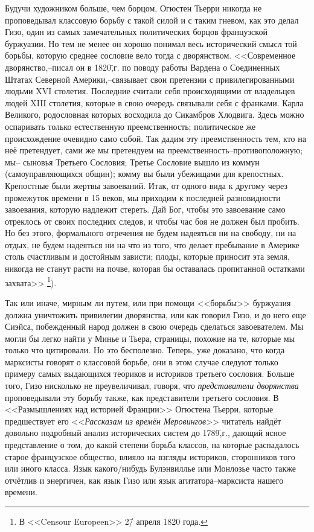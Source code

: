 Будучи художником больше, чем борцом, Огюстен Тьерри никогда не проповедывал классовую борьбу с такой силой и с таким гневом, как это делал Гизо, один из самых замечательных политических борцов французской буржуазии. Но тем не менее он хорошо понимал весь исторический смысл той борьбы, которую среднее сословие вело тогда с дворянством. <<Современное дворянство,\---писал он в 1820\=,г. по поводу работы Вардена о Соединенных Штатах Северной Америки,\---связывает свои претензии с привилегированными людьми XVI столетия. Последние считали себя происходящими от владельцев людей XIII столетия, которые в свою очередь связывали себя с франками. Карла Великого, родословная которых восходила до Сикамбров Хлодвига. Здесь можно оспаривать только естественную преемственность; политическое же происхождение очевидно само собой. Так дадим эту преемственность тем, кто на неё претендует, сами же мы претендуем на преемственность\---противоположную; мы\--- сыновья Третьего Сословия; Третье Сословие вышло из коммун (самоуправляющихся общин); комму вы были убежищами для крепостных. Крепостные были жертвы завоеваний. Итак, от одного вида к другому через промежуток времени в 15 веков, мы приходим к последней разновидности завоевания, которую надлежит стереть. Дай Бог, чтобы это завоевание само отреклось от своих последних следов, и чтобы час боя не должен был пробить. Но без этого, формального отречения не будем надеяться ни на свободу, ни на отдых, не будем надеяться ни на что из того, что делает пребывание в Америке столь счастливым и достойным зависти; плоды, которые приносит эта земля, никогда не станут расти на почве, которая бы оставалась пропитанной остатками захвата>> \footnote{В <<Censour Europeen>> 2\=/ апреля 1820 года.}).

Так или иначе, мирным ли путем, или при помощи <<борьбы>> буржуазия должна уничтожить привилегии дворянства, или как говорил Гизо, и до него еще Сиэйса, побежденный народ должен в свою очередь сделаться завоевателем. Мы могли бы легко найти у Минье и Тьера, страницы, похожие на те, которые мы только что цитировали. Но это бесполезно. Теперь, уже доказано, что когда марксисты говорят о классовой борьбе, они в этом случае следуют только примеру самых выдающихся теориков и историков третьего сословия. Больше того, Гизо нисколько не преувеличивал, говоря, что \emph{представители дворянства} проповедывали эту борьбу также, как представители третьего сословия. В <<Размышлениях над историей Франции>> Огюстена Тьерри, которые предшествует его <<\emph{Рассказам из времён Меровингов}>> читатель найдёт довольно подробный анализ исторических систем до 1789\=,г., дающий ясное представление о том, до какой степени борьба классов, на которые распадалось старое французское общество, влияло на взгляды историков, сторонников того или иного класса. Язык какого\-/нибудь Булэнвиллье или Монлозье часто также отчётлив и энергичен, как язык Гизо или язык агитатора\---марксиста нашего времени.

